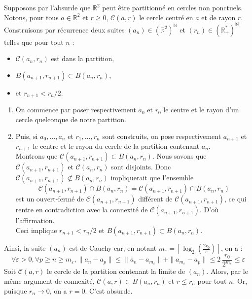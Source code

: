 Supposons par l'absurde que $\mathbb{R}^2 $ peut être partitionné en cercles non ponctuels. Notons, pour tous $a\in \mathbb{R}^2 $ et $r\geqslant 0$, $\mathscr{C}(a,r)$ le cercle centré en $a$ et de rayon $r$. Construisons par récurrence deux suites $(a_{n} )\in (\mathbb{R}^2 )^{\mathbb{N}}$ et $(r_{n} ) \in  (\mathbb{R}_+^*)^{\mathbb{N}}$ telles que pour tout $n$ :
\begin{itemize}
	\item $\mathscr{C}(a_{n} ,r_{n} )$ est dans la partition,
	\item $B(a_{n+1},r_{n+1}) \subset B(a_{n} ,r_{n} )$,
	\item et $r_{n+1} <  r_{n} /2$.
\end{itemize}
\begin{enumerate}
	\item On commence par poser respectivement $a_{0}$ et $r_{0}$ le centre et le rayon d'un cercle quelconque de notre partition.
	\item Puis, si $a_{0} ,\dots ,a_{n}$ et $r_{1} ,\dots ,r_{n}$ sont construits, on pose respectivement $a_{n+1}$ et $r_{n+1}$ le centre et le rayon du cercle de la partition contenant $a_{n}$.\\
	Montrons que $\mathscr{C}(a_{n+1} ,r_{n+1} )\subset B(a_{n} ,r_{n} )$. Nous savons que $\mathscr{C}(a_{n+1} ,r_{n+1} )$ et $\mathscr{C}(a_{n} ,r_{n} )$ sont disjoints. Donc $\mathscr{C}(a_{n+1} ,r_{n+1} )\not\subset B(a_{n} ,r_{n} )$ impliquerait que l'ensemble \[\mathscr{C}(a_{n+1} ,r_{n+1} ) \cap  B(a_{n} ,r_{n} ) = \mathscr{C}(a_{n+1} ,r_{n+1} ) \cap  \overline{B}(a_{n} ,r_{n} )\] est un ouvert-fermé de $\mathscr{C}(a_{n+1} ,r_{n+1} )$ différent de $\mathscr{C}(a_{n+1} ,r_{n+1} )$, ce qui rentre en contradiction avec la connexité de $\mathscr{C}(a_{n+1} ,r_{n+1} )$. D'où l'affirmation.\\
	Ceci implique $r_{n+1} <  r_{n} /2$ et $B(a_{n+1},r_{n+1}) \subset B(a_{n} ,r_{n} )$.
\end{enumerate}
Ainsi, la suite $(a_{n} )$ est de Cauchy car, en notant $m_{\varepsilon } =\left\lceil \log_{2} \!\left(\frac{2r_{0} }{\varepsilon } \right) \right\rceil$, on a : \[\forall \varepsilon >0, \forall p\geqslant n\geqslant m_{\varepsilon } , \|a_{n} - a_{p} \|\leqslant \|a_{n} - a_{m_{\varepsilon }} \|+ \|a_{m_{\varepsilon }} - a_{p} \| \leqslant  2\, \frac{r_{0} }{2^{m_{\varepsilon }}} \leqslant  \varepsilon \]
Soit $\mathscr{C}(a,r)$ le cercle de la partition contenant la limite de $(a_{n} )$. Alors, par le même argument de connexité, $\mathscr{C}(a,r)\subset B(a_{n} ,r_{n} )$ et $r\leqslant r_{n}$ pour tout $n$. Or, puisque $r_{n} \longrightarrow  0$, on a $r=0$. C'est absurde.

